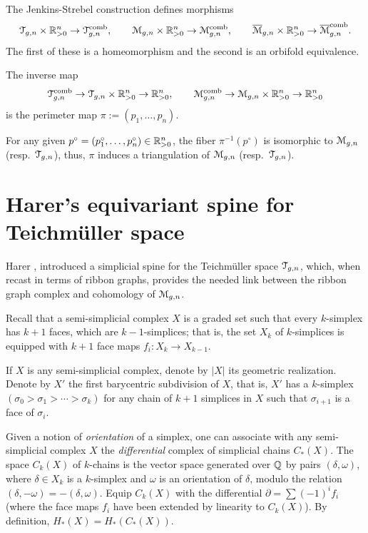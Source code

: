 \begin{theorem} 
  The Jenkins-Strebel construction defines morphisms
  \begin{equation*}
    \mathcal{T}_{g,n} \times \mathbb{R}_{>0}^n \to \mathcal{T}\sp{\text{comb}}_{g,n}, 
    \qquad
    \mathcal{M}_{g,n} \times \mathbb{R}_{>0}^n \to \mathcal{M}\sp{\text{comb}}_{g,n}, 
    \qquad 
    \overline{\mathcal{M}}_{g,n} \times \mathbb{R}_{>0}^n \to \overline{\mathcal{M}}\sp{\text{comb}}_{g,n}.
  \end{equation*}
  The first of these is a homeomorphism and the second is an orbifold
  equivalence. 

  The inverse map
  \begin{equation*}
    \mathcal{T}\sp{\text{comb}}_{g,n} \to \mathcal{T}_{g,n} \times \mathbb{R}_{>0}^n \to \mathbb{R}_{>0}^n,
    \qquad
    \mathcal{M}\sp{\text{comb}}_{g,n} \to \mathcal{M}_{g,n} \times \mathbb{R}_{>0}^n \to \mathbb{R}_{>0}^n
  \end{equation*}
  is the perimeter map $\pi := (p_1, \ldots, p_n)$.  
\end{theorem}

For any given $p^\circ = (p_1^\circ, \ldots, p_n^\circ) \in \mathbb{R}_{>0}^n$, the fiber
$\pi^{-1}(p^\circ)$ is isomorphic to $\mathcal{M}_{g,n}$ (resp.\ $\mathcal{T}_{g,n}$), thus,
$\pi$ induces a triangulation of $\mathcal{M}_{g,n}$ (resp.\ $\mathcal{T}_{g,n}$).



\section{Harer's equivariant spine for Teichm\"uller space}
\label{sec:spine}

Harer \cite{harer;cohomological-dimension}, introduced a simplicial
spine for the Teichm\"uller space $\mathcal{T}_{g,n}$, which, when recast in
terms of ribbon graphs, provides the needed link between the ribbon
graph complex and cohomology of $\mathcal{M}_{g,n}$.

Recall that a semi-simplicial complex $X$ is a graded set such that
every $k$-simplex has $k+1$ faces, which are $k-1$-simplices; that is,
the set $X_k$ of $k$-simplices is equipped with $k+1$ face maps
$f_i:X_k \to X_{k-1}$.

If $X$ is any semi-simplicial complex, denote by $|X|$ its geometric
realization.  Denote by $X'$ the first barycentric subdivision of $X$,
that is, $X'$ has a $k$-simplex $(\sigma_0 > \sigma_1 > \cdots > \sigma_k)$ for any chain
of $k+1$ simplices in $X$ such that $\sigma_{i+1}$ is a face of $\sigma_i$.

Given a notion of \emph{orientation} of a simplex, one can associate
with any semi-simplicial complex $X$ the \emph{differential} complex
of simplicial chains $C_*(X)$.  The space $C_k(X)$ of $k$-chains is
the vector space generated over $\mathbb{Q}$ by pairs $(\delta, \omega)$, where $\delta \in X_k$
is a $k$-simplex and $\omega$ is an orientation of $\delta$, modulo the relation
$(\delta, -\omega) = -(\delta, \omega)$.  Equip $C_k(X)$ with the differential $\partial = \sum
(-1)^if_i$ (where the face maps $f_i$ have been extended by linearity
to $C_k(X)$).  By definition, $H_*(X) = H_*(C_*(X))$.


